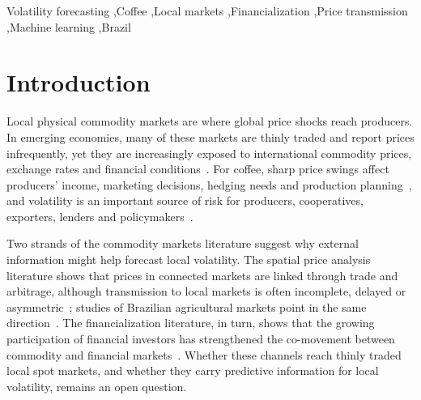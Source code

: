 \documentclass[a4paper,fleqn]{cas-sc}
\begin{document}


\begin{keywords}
Volatility forecasting \sep Coffee \sep Local markets \sep Financialization \sep Price transmission \sep Machine learning \sep Brazil
\end{keywords}

\maketitle

\section{Introduction}
\label{sec:introduction}

Local physical commodity markets are where global price shocks reach producers. In emerging economies, many of these markets are thinly traded and report prices infrequently, yet they are increasingly exposed to international commodity prices, exchange rates and financial conditions~\citep{Nassani2025FinancialIntegration,manogna2025dynamicnexus}. For coffee, sharp price swings affect producers' income, marketing decisions, hedging needs and production planning~\citep{Zhang2025ClimateRealizedVolatility,Chaovanapoonphol2023CoffeeGARCHX,Fahmi2023LocalCoffeePolicy}, and volatility is an important source of risk for producers, cooperatives, exporters, lenders and policymakers~\citep{Manogna2025HybridVolatility,Brun2026GARCHCoffeeRisk}.

Two strands of the commodity markets literature suggest why external information might help forecast local volatility. The spatial price analysis literature shows that prices in connected markets are linked through trade and arbitrage, although transmission to local markets is often incomplete, delayed or asymmetric~\citep{FacklerGoodwin2001}; studies of Brazilian agricultural markets point in the same direction~\citep{84894858898,84944902729,105014742301}. The financialization literature, in turn, shows that the growing participation of financial investors has strengthened the co-movement between commodity and financial markets~\citep{TangXiong2012,ChengXiong2014,kupabado2025price,martin2015finance}. Whether these channels reach thinly traded local spot markets, and whether they carry predictive information for local volatility, remains an open question.
\end{document}
